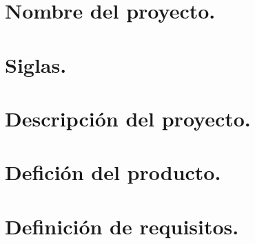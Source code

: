 \chapter*{Nombre del proyecto.}

\chapter*{Siglas.}

\chapter*{Descripci\'on del proyecto.}

\chapter*{Defici\'on del producto.}

\chapter*{Definici\'on de requisitos.}